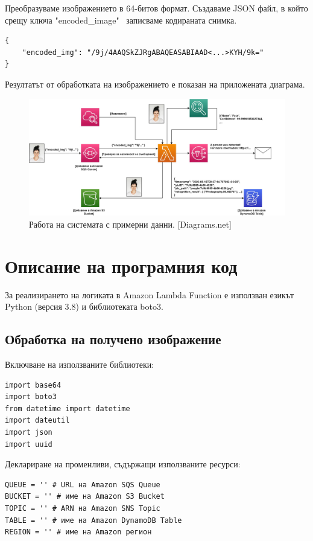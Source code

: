 \documentclass[12pt]{article}
\begin{document}
Преобразуваме изображението в 64-битов формат. Създаваме JSON файл, в който срещу ключа "encoded\_image" \ записваме кодираната снимка.

\begin{verbatim}
{
    "encoded_img": "/9j/4AAQSkZJRgABAQEASABIAAD<...>KYH/9k="
}
\end{verbatim}

Резултатът от обработката на изображението е показан на приложената диаграма.

\begin{figure}[h!]
\centering
    \includegraphics[width=\linewidth]{AWS_example.jpg}
  \caption{Работа на системата с примерни данни. [Diagrams.net]}
\end{figure}

\clearpage
\pagebreak
 
\section{Описание на програмния код}

\hspace{\parindent}За реализирането на логиката в Amazon Lambda Function е използван езикът Python (версия 3.8) и библиотеката boto3.

\subsection{Обработка на получено изображение} \label{subsec-main-lambda}

\hspace{\parindent}Включване на използваните библиотеки:
\begin{verbatim}
import base64
import boto3
from datetime import datetime
import dateutil
import json
import uuid
\end{verbatim}

Деклариране на променливи, съдържащи използваните ресурси:
\begin{verbatim}
QUEUE = '' # URL на Amazon SQS Queue
BUCKET = '' # име на Amazon S3 Bucket
TOPIC = '' # ARN на Amazon SNS Topic
TABLE = '' # име на Amazon DynamoDB Table
REGION = '' # име на Amazon регион
\end{verbatim}
\end{document}

